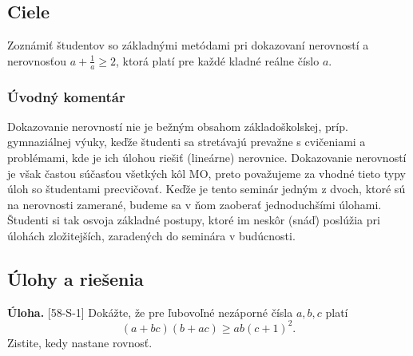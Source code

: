 \documentclass[11pt,a4paper,oneside,final]{book}
\newcommand{\ul}{\textbf{Úloha.} }
\begin{document}
\subsection*{Ciele}
Zoznámiť študentov so základnými metódami pri dokazovaní nerovností a nerovnosťou $a+\frac{1}{a}\geq 2$, ktorá platí pre každé kladné reálne číslo $a$.

\subsubsection*{Úvodný komentár}
Dokazovanie nerovností nie je bežným obsahom základoškolskej, príp. gymnaziálnej výuky, keďže študenti sa stretávajú prevažne s cvičeniami a problémami, kde je ich úlohou riešiť (lineárne) nerovnice. Dokazovanie nerovností je však častou súčasťou všetkých kôl MO, preto považujeme za vhodné tieto typy úloh so študentami precvičovať. Keďže je tento seminár jedným z dvoch, ktoré sú na nerovnosti zamerané, budeme sa v ňom zaoberať jednoduchšími úlohami. Študenti si tak osvoja základné postupy, ktoré im neskôr (snáď) poslúžia pri úlohách zložitejších, zaradených do seminára v budúcnosti.

\subsection*{Úlohy a riešenia}
\begin{tcolorbox}[breakable,notitle,boxrule=0pt,colback=light-gray,colframe=light-gray]\ul [58-S-1]
Dokážte, že pre ľubovoľné nezáporné čísla $a, b, c$ platí $$(a + bc)(b + ac) \geq ab(c + 1)^2.$$
Zistite, kedy nastane rovnosť.

\end{tcolorbox}
\end{document}
